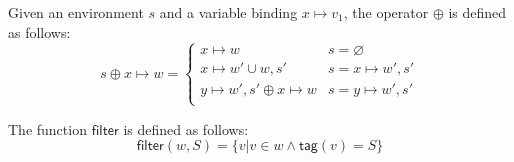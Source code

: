 \documentclass[preprint,authoryear,sort&compress,9pt,nocopyrightspace]{article}
\newcommand{\lab}{\mathsf{tag}}
\newcommand{\funt}{\mathsf{Fun}}
\newcommand{\filtrar}{\mathsf{filter}}
\newcommand{\buscar}{\mathsf{lookup}}
\begin{document}
\begin{comment}
\begin{definition}[$\oplus$]
\label{definition:tcs}
\mbox{}
Given an environment  $s$ and a variable binding $x \mapsto v_1$, the operator $\oplus$ is defined  as follows:
\[ s \oplus x \mapsto w = \begin{cases} 
      x \mapsto \{w\}& s =  \varnothing \wedge w = v\\
      x \mapsto w & s =  \varnothing \wedge w \neq v\\
      x \mapsto w' \cup \{w\}, s' & s = x \mapsto w', s' \wedge w = v\\
      x \mapsto w' \cup w, s' & s = x \mapsto w', s' \wedge w \neq v\\
      y \mapsto w', s' \oplus x \mapsto w & s = y \mapsto w', s'\\
   \end{cases}
\]
\end{definition}
\end{comment}

\begin{definition}[$\oplus$]
\label{definition:tcs}
\mbox{}
Given an environment  $s$ and a variable binding $x \mapsto v_1$, the operator $\oplus$ is defined  as follows:
\[ s \oplus x \mapsto w = \begin{cases} 
      x \mapsto w & s =  \varnothing\\
      x \mapsto w' \cup w, s' & s = x \mapsto w', s'\\
      y \mapsto w', s' \oplus x \mapsto w & s = y \mapsto w', s'\\
   \end{cases}
\]
\end{definition}


\begin{definition}[$\filtrar(\cdot, \cdot)$]
\label{definition:tcs}
\mbox{}
The function $\filtrar$ is defined  as follows:
\[ \filtrar(w, S) = \{v| v \in w \wedge \lab(v) = S \}
\]
\end{definition}


\begin{comment}
\begin{definition}[$\buscar$]
\label{definition:tcs}
\mbox{}
The function $\buscar$ is defined  as follows:
 \[ \buscar(w_1, w_2) = (v_1, v_2)  \  !\exists v_1 \in w_1|\lab(v_1) = \funt \ \wedge \ w_2 = \{ v_2 \}
 \]
 \end{definition}
\end{comment}


\begin{comment}
\begin{definition}[$\buscar$]
\label{definition:tcs}
\mbox{}
The function $\buscar$ is defined  as follows:
 \[\buscar(w_1, w_2) = (v_1, w_2)  \  !\exists v_1 \in w_1|\lab(v_1) = \funt\]
 \end{definition}
\end{comment}
 
\end{document}
